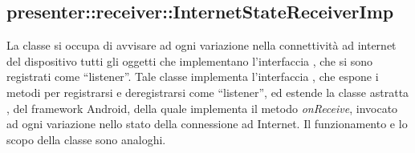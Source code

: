 \documentclass[../Tesi.tex]{subfiles}
\begin{document}
		\subsection{presenter::receiver::InternetStateReceiverImp}
		La classe  si occupa di avvisare ad ogni variazione nella connettività ad internet del dispositivo tutti gli oggetti che implementano l'interfaccia , che si sono registrati come ``listener''. Tale classe implementa l'interfaccia , che espone i metodi per registrarsi e deregistrarsi come ``listener'', ed estende la classe astratta , del framework Android, della quale implementa il metodo \textit{onReceive}, invocato ad ogni variazione nello stato della connessione ad Internet. Il funzionamento e lo scopo della classe  sono analoghi. 
\end{document}
